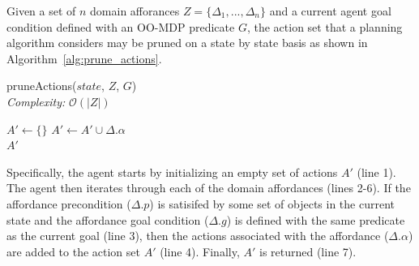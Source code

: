 \documentclass[]{article}
\begin{document}




Given a set of $n$ domain afforances $Z = \{\Delta_1, ..., \Delta_n\}$ and a current agent goal condition defined with an OO-MDP predicate $G$, the action set that a planning algorithm considers may be pruned on a state by state basis as shown in Algorithm~\ref{alg:prune_actions}.
\begin{algorithm}
  \caption{pruneActions($state$, $Z$, $G$) \\ {\it Complexity:} $\mathcal{O}(|Z|)$}
  \begin{algorithmic}[1]
    \State $A' \leftarrow \{\}$
    \State $A' \leftarrow A' \cup \Delta.\alpha$
    \EndIf
    \EndFor \\
    \Return $A'$
  \end{algorithmic}
  \label{alg:prune_actions}
\end{algorithm}
Specifically, the agent starts
by initializing an empty set of actions $A'$ (line 1). The agent then iterates
through each of the domain affordances (lines 2-6). If the affordance
precondition ($\Delta.p$) is satisifed by some set of objects in the current state
and the affordance goal condition ($\Delta.g$) is defined with the same predicate
as the current goal (line 3), then the actions associated with the affordance ($\Delta.\alpha$) are added to the action set $A'$ (line 4). Finally, $A'$ is returned (line 7). 

\end{document}
